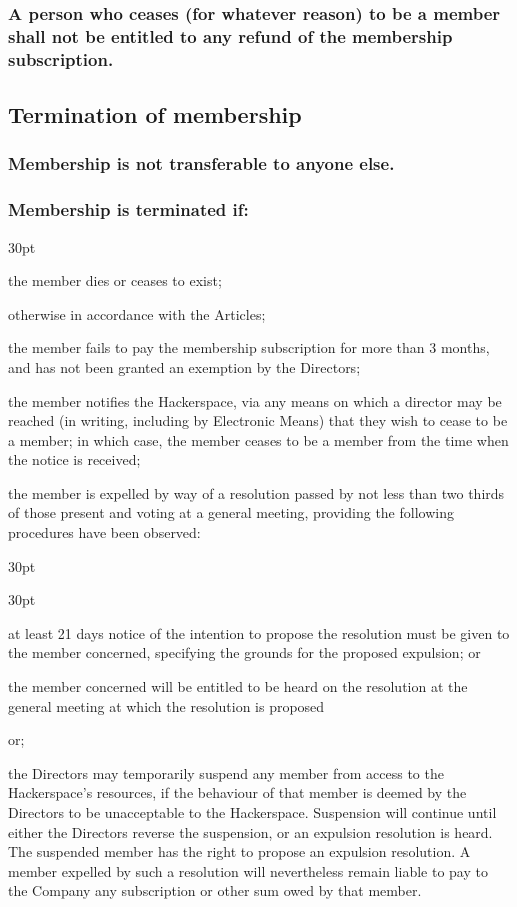 \documentclass[12pt]{article}
\def\clauseindent{30pt}
\newenvironment{subindentpara}{\begin{adjustwidth}{\clauseindent}{}\begin{hanginglist}}{\end{hanginglist}\end{adjustwidth}}
\newenvironment{subindentlist}{\begin{adjustwidth}{\clauseindent}{}\begin{labeledlist}{\clauseindent}}{\end{labeledlist}\end{adjustwidth}}
\begin{document}
\subsubsection{A person who ceases (for whatever reason) to be a member shall not be entitled to any refund of the membership subscription.}

\subsection{Termination of membership}
\subsubsection{Membership is not transferable to anyone else.}
\subsubsection{Membership is terminated if:}
\begin{subindentpara}
    
    \item the member dies or ceases to exist;
    \item otherwise in accordance with the Articles;
    \item the member fails to pay the membership subscription for more than 3 months, and has not been granted an exemption by the Directors;
    \item the member notifies the Hackerspace, via any means on which a director may be reached (in writing, including by Electronic Means) that they wish to cease to be a member; in which case, the member ceases to be a member from the time when the notice is received;
    \item the member is expelled by way of a resolution passed by not less than two thirds of those present and voting at a general meeting, providing the following procedures have been observed: 
    \begin{subindentlist}
        \item at least 21 days notice of the intention to propose the resolution must be given to the member concerned, specifying the grounds for the proposed expulsion; or
        \item the member concerned will be entitled to be heard on the resolution at the general meeting at which the resolution is proposed
    \end{subindentlist}
    \item or;
    \item the Directors may temporarily suspend any member from access to the Hackerspace's resources, if the behaviour of that member is deemed by the Directors to be unacceptable to the Hackerspace. Suspension will continue until either the Directors reverse the suspension, or an expulsion resolution is heard. The suspended member has the right to propose an expulsion resolution. A member expelled by such a resolution will nevertheless remain liable to pay to the Company any subscription or other sum owed by that member.
\end{subindentpara}
\end{document}
